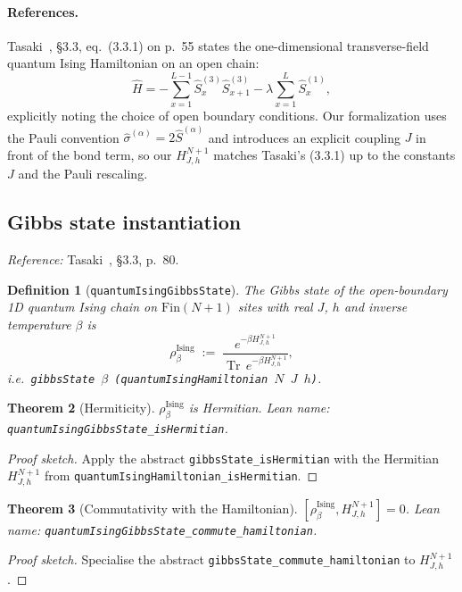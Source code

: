 \documentclass[a4paper,11pt]{article}
\newtheorem{theorem}{Theorem}
\newtheorem{definition}[theorem]{Definition}
\begin{document}
\paragraph{References.}
Tasaki~\cite{Tasaki:QMB}, §3.3, eq.~(3.3.1) on p.~55 states the
one-dimensional transverse-field quantum Ising Hamiltonian on an open
chain:
\[
  \hat H
    = -\sum_{x=1}^{L-1}\hat S^{(3)}_x \hat S^{(3)}_{x+1}
      -\lambda \sum_{x=1}^{L} \hat S^{(1)}_x,
\]
explicitly noting the choice of open boundary conditions. Our
formalization uses the Pauli convention
$\hat\sigma^{(\alpha)} = 2\hat S^{(\alpha)}$ and introduces an
explicit coupling $J$ in front of the bond term, so our $H_{J,h}^{N+1}$
matches Tasaki's (3.3.1) up to the constants $J$ and the Pauli rescaling.

\subsection{Gibbs state instantiation}
\label{subsec:ising-gibbs}

\emph{Reference:} Tasaki~\cite{Tasaki:QMB}, §3.3, p.~80.

\begin{definition}[\texttt{quantumIsingGibbsState}]
The Gibbs state of the open-boundary 1D quantum Ising chain on
$\mathrm{Fin}(N+1)$ sites with real $J$, $h$ and inverse temperature
$\beta$ is
\[
  \rho_\beta^{\mathrm{Ising}}
  \;:=\;
  \frac{e^{-\beta H_{J,h}^{N+1}}}{\operatorname{Tr}\,e^{-\beta H_{J,h}^{N+1}}},
\]
i.e.\ \texttt{gibbsState $\beta$ (quantumIsingHamiltonian $N$ $J$ $h$)}.
\end{definition}

\begin{theorem}[Hermiticity]
$\rho_\beta^{\mathrm{Ising}}$ is Hermitian. Lean name:
\texttt{quantumIsingGibbsState\_isHermitian}.
\end{theorem}

\begin{proof}[Proof sketch]
Apply the abstract \texttt{gibbsState\_isHermitian} with the Hermitian
$H_{J,h}^{N+1}$ from \texttt{quantumIsingHamiltonian\_isHermitian}.
\end{proof}

\begin{theorem}[Commutativity with the Hamiltonian]
$[\rho_\beta^{\mathrm{Ising}}, H_{J,h}^{N+1}] = 0$. Lean name:
\texttt{quantumIsingGibbsState\_commute\_hamiltonian}.
\end{theorem}

\begin{proof}[Proof sketch]
Specialise the abstract \texttt{gibbsState\_commute\_hamiltonian} to
$H_{J,h}^{N+1}$.
\end{proof}
\end{document}
